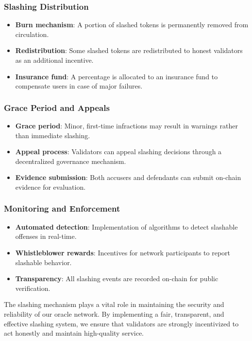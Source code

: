 \documentclass[12pt,a4paper]{article}
\begin{document}
	\subsubsection{Slashing Distribution}
	\begin{itemize}
		\item \textbf{Burn mechanism}: A portion of slashed tokens is permanently removed from circulation.
		\item \textbf{Redistribution}: Some slashed tokens are redistributed to honest validators as an additional incentive.
		\item \textbf{Insurance fund}: A percentage is allocated to an insurance fund to compensate users in case of major failures.
	\end{itemize}
	
	\subsubsection{Grace Period and Appeals}
	\begin{itemize}
		\item \textbf{Grace period}: Minor, first-time infractions may result in warnings rather than immediate slashing.
		\item \textbf{Appeal process}: Validators can appeal slashing decisions through a decentralized governance mechanism.
		\item \textbf{Evidence submission}: Both accusers and defendants can submit on-chain evidence for evaluation.
	\end{itemize}
	
	\subsubsection{Monitoring and Enforcement}
	\begin{itemize}
		\item \textbf{Automated detection}: Implementation of algorithms to detect slashable offenses in real-time.
		\item \textbf{Whistleblower rewards}: Incentives for network participants to report slashable behavior.
		\item \textbf{Transparency}: All slashing events are recorded on-chain for public verification.
	\end{itemize}
	
	The slashing mechanism plays a vital role in maintaining the security and reliability of our oracle network. By implementing a fair, transparent, and effective slashing system, we ensure that validators are strongly incentivized to act honestly and maintain high-quality service.
	
\end{document}
